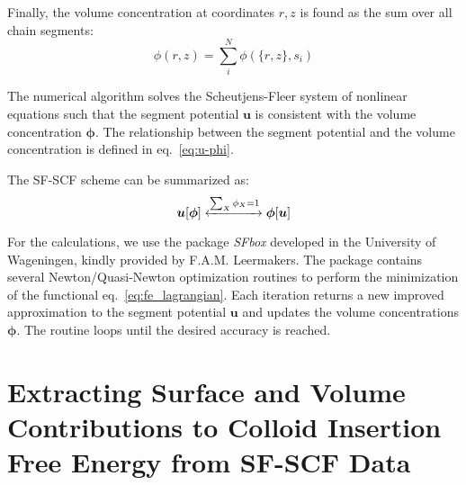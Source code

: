 \documentclass[10pt, a4paper]{article}
\begin{document}
\begin{multicols}{2}
Finally, the volume concentration at coordinates $r, z$ is found as the sum over all chain segments:
\begin{equation}
    \phi(r, z) = \sum_{i}^{N} \phi(\{r, z\}, s_i)
\end{equation}

The numerical algorithm solves the Scheutjens-Fleer system of nonlinear equations such that the segment potential $\mathbf{u}$ is consistent with the volume concentration $\boldsymbol{\phi}$.
The relationship between the segment potential and the volume concentration is defined in eq.~\ref{eq:u-phi}.

The SF-SCF scheme can be summarized as:
\begin{equation}
    \boldsymbol{u}[\boldsymbol{\phi}] \xleftrightarrow[]{\sum_{X} \phi_X = 1} \boldsymbol{\phi}[\boldsymbol{u}]
\end{equation}

For the calculations, we use the package \emph{SFbox} developed in the University of Wageningen, kindly provided by F.A.M. Leermakers.
The package contains several Newton/Quasi-Newton optimization routines to perform the minimization of the functional eq.~\ref{eq:fe_lagrangian}.
Each iteration returns a new improved approximation to the segment potential $\mathbf{u}$ and updates the volume concentrations $\mathbf{\phi}$.
The routine loops until the desired accuracy is reached.

\end{multicols}

\section{Extracting Surface and Volume Contributions to Colloid Insertion Free Energy from SF-SCF Data}
\end{document}
